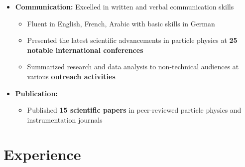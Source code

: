 \documentclass{myfancycv}
\begin{document}
{\begin{itemize}
{{\begin{itemize}
\end{itemize}}%
}

\vspace{6pt}

\item{ \textbf{Communication:} Excelled in written and verbal communication skills
{\begin{itemize}\setlength\itemindent{-2.2em}
    \item Fluent in English, French, Arabic with basic skills in German
    \item Presented the latest scientific advancements in particle physics at {\bf25 notable international conferences}
    \item Summarized research and data analysis to non-technical audiences at various {\bf outreach activities}
\end{itemize}}%
}

\vspace{6pt}

\item {\textbf{Publication:}
{\begin{itemize}\setlength\itemindent{-2.2em}
    \item Published {\bf15 scientific papers} in peer-reviewed particle physics and instrumentation journals
\end{itemize}}%
}

\end{itemize}


\section{Experience}

\begin{itemize}


\end{itemize}}
\end{document}
